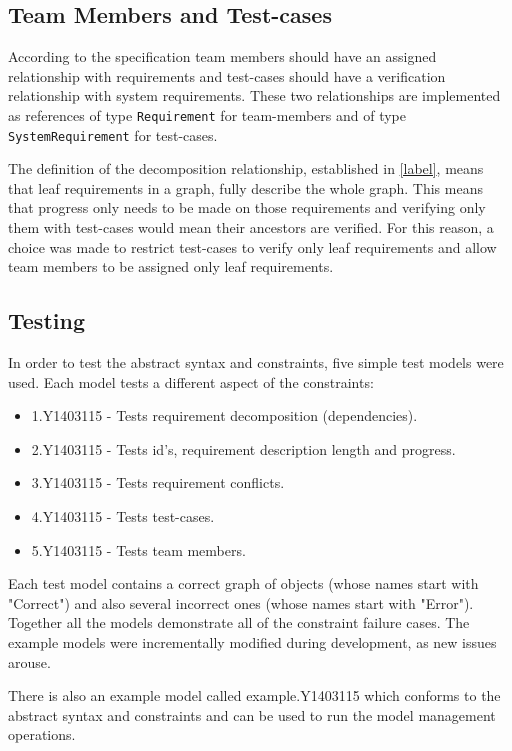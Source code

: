 \documentclass[11pt,a4paper]{article}
\begin{document}
	\subsection{Team Members and Test-cases}
	According to the specification team members should have an assigned relationship with requirements and test-cases should have a verification relationship with system requirements. These two relationships are implemented as references of type \texttt{Requirement} for team-members and of type \texttt{SystemRequirement} for test-cases. 
	
	The definition of the decomposition relationship, established in \autoref{label}, means that leaf requirements in a graph, fully describe the whole graph. This means that progress only needs to be made on those requirements and verifying only them with test-cases would mean their ancestors are verified. For this reason, a choice was made to restrict test-cases to verify only leaf requirements and allow team members to be assigned only leaf requirements.  
	
	\subsection{Testing} \label{sec:tests}
	In order to test the abstract syntax and constraints, five simple test models were used. Each model tests a different aspect of the constraints:
	
	\begin{itemize}[noitemsep]
		\item 1.Y1403115 - Tests requirement decomposition (dependencies).
		\item 2.Y1403115 - Tests id's, requirement description length and progress.
		\item 3.Y1403115 - Tests requirement conflicts.
		\item 4.Y1403115 - Tests test-cases.
		\item 5.Y1403115 - Tests team members.
	\end{itemize}
	
	Each test model contains a correct graph of objects (whose names start with "Correct") and also several incorrect ones (whose names start with "Error"). Together all the models demonstrate all of the constraint failure cases. The example models were incrementally modified during development, as new issues arouse. 
	
	There is also an example model called example.Y1403115 which conforms to the abstract syntax and constraints and can be used to run the model management operations.
	
\end{document}
